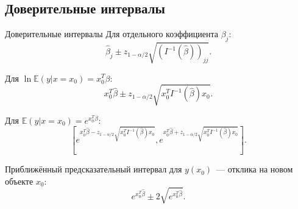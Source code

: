 \documentclass[9pt,pdf,utf8,hyperref={unicode},aspectratio=169]{beamer}
\def\argmin#1{ \mathop{\text{argmin}}\limits_{#1} }
\begin{document}
%
%	

\subsection{Доверительные интервалы}
\begin{frame}{Доверительные интервалы}
	Для отдельного коэффициента $\beta_j$:
	$$\hat{\beta}_j \pm z_{1-\alpha/2} \sqrt{\left(I^{-1} \left(\hat{\beta}\right)\right)_{jj}}.$$
	
	Для $\ln\mathbb{E}\left(y\left|\right.x=x_0\right)=x_0^T\beta$:
	$$x_0^T \hat{\beta} \pm z_{1-\alpha/2} \sqrt{x_0^T I^{-1}\left(\hat{\beta}\right) x_0}.$$
	
	Для $\mathbb{E}\left(y\left|\right.x=x_0\right)=e^{x_0^T\beta}$:
	$$\left[e^{x_0^T \hat{\beta} - z_{1-\alpha/2} \sqrt{x_0^T I^{-1}\left(\hat{\beta}\right) x_0}}, e^{x_0^T \hat{\beta} + z_{1-\alpha/2} \sqrt{x_0^T I^{-1}\left(\hat{\beta}\right) x_0}}\right].$$
	
	Приближённый предсказательный интервал для $y\left(x_0\right)$~--- отклика на новом объекте $x_0$:
	$$e^{x_0^T\hat{\beta}} \pm 2\sqrt{e^{x_0^T\hat{\beta}}}.$$
\end{frame}
\end{document}
